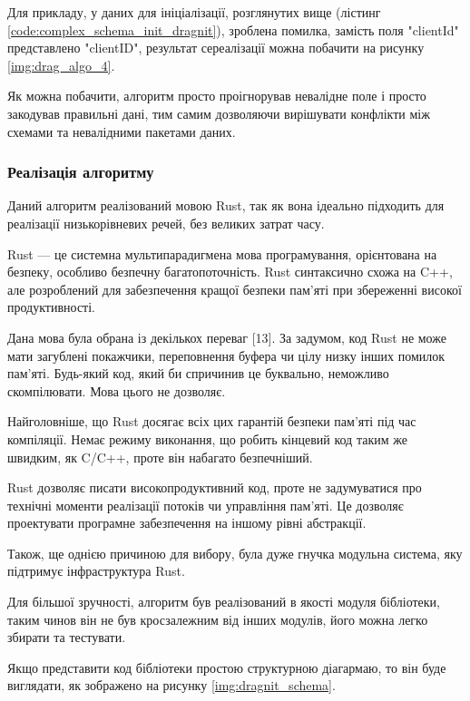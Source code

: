 \documentclass{lib/styles/default-style}
\begin{document}
    Для прикладу, у даних для ініціалізації, розглянутих вище (лістинг \ref{code:complex_schema_init_dragnit}), зроблена помилка,
    замість поля "clientId" представлено "clientID", результат сереалізації можна побачити на рисунку \ref{img:drag_algo_4}.


    Як можна побачити, алгоритм просто проігнорував невалідне поле і просто закодував правильні дані, тим самим дозволяючи
    вирішувати конфлікти між схемами та невалідними пакетами даних.

    \subsubsection{Реалізація алгоритму}

    Даний алгоритм реалізований мовою Rust, так як вона ідеально підходить для реалізації низькорівневих речей, без великих затрат часу.

    Rust --- це системна мультипарадигмена мова програмування, орієнтована на безпеку, особливо безпечну багатопоточність. 
    Rust синтаксично схожа на C++, але розроблений для забезпечення кращої безпеки пам’яті при збереженні високої продуктивності.

    Дана мова була обрана із декількох переваг [13]. За задумом, код Rust не може мати загублені покажчики,
    переповнення буфера чи цілу низку інших помилок пам'яті.
    Будь-який код, який би спричинив це буквально, неможливо скомпілювати.
    Мова цього не дозволяє.

    Найголовніше, що Rust досягає всіх цих гарантій безпеки пам’яті під час компіляції.
    Немає режиму виконання, що робить кінцевий код таким же швидким, як C/C++, проте він набагато безпечніший.

    Rust дозволяє писати високопродуктивний код, проте не задумуватися про технічні моменти реалізації потоків чи
    управління пам’яті. Це дозволяє проектувати програмне забезпечення на іншому рівні абстракції.

    Також, ще однією причиною для вибору, була дуже гнучка модульна система, яку підтримує інфраструктура Rust.

    Для більшої зручності, алгоритм був реалізований в якості модуля бібліотеки, таким чинов він не був кросзалежним від інших модулів,
    його можна легко збирати та тестувати.

    Якщо представити код бібліотеки простою структурною діагармаю, то він буде виглядати, як зображено на рисунку \ref{img:dragnit_schema}.
\end{document}
